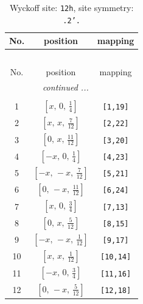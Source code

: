 \documentclass[fleqn,8pt]{jsarticle}
\begin{document}
\begin{longtable}{ccc}
\caption{Wyckoff site: {\tt 12h}, site symmetry: {\tt .2'.}}
 \\
 \hline \hline
No. & position & mapping \\ \hline \endfirsthead

\multicolumn{2}{l}{\tablename\ \thetable{}} \\
 \hline \hline
No. & position & mapping \\ \hline \endhead

 \hline \hline
\multicolumn{2}{r}{\footnotesize\it continued ...} \\ \endfoot

 \hline \hline
\multicolumn{2}{r}{} \\ \endlastfoot

1 & $\left[ x,\, 0,\, \frac{1}{4} \right]$ & {\tt [1,19]} \\ \hline
2 & $\left[ x,\, x,\, \frac{7}{12} \right]$ & {\tt [2,22]} \\ \hline
3 & $\left[ 0,\, x,\, \frac{11}{12} \right]$ & {\tt [3,20]} \\ \hline
4 & $\left[ - x,\, 0,\, \frac{1}{4} \right]$ & {\tt [4,23]} \\ \hline
5 & $\left[ - x,\, - x,\, \frac{7}{12} \right]$ & {\tt [5,21]} \\ \hline
6 & $\left[ 0,\, - x,\, \frac{11}{12} \right]$ & {\tt [6,24]} \\ \hline
7 & $\left[ x,\, 0,\, \frac{3}{4} \right]$ & {\tt [7,13]} \\ \hline
8 & $\left[ 0,\, x,\, \frac{5}{12} \right]$ & {\tt [8,15]} \\ \hline
9 & $\left[ - x,\, - x,\, \frac{1}{12} \right]$ & {\tt [9,17]} \\ \hline
10 & $\left[ x,\, x,\, \frac{1}{12} \right]$ & {\tt [10,14]} \\ \hline
11 & $\left[ - x,\, 0,\, \frac{3}{4} \right]$ & {\tt [11,16]} \\ \hline
12 & $\left[ 0,\, - x,\, \frac{5}{12} \right]$ & {\tt [12,18]} \\
\end{longtable}
\renewcommand{\arraystretch}{1.2}
\end{document}
